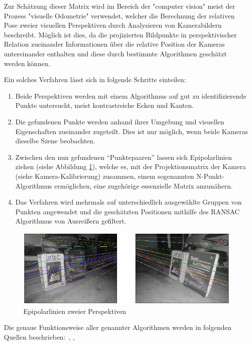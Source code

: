 \documentclass[12pt, ngerman]{article}
\begin{document}
Zur Schätzung dieser Matrix wird im Bereich der "computer vision" meist der Prozess "visuelle Odometrie" verwendet, welcher die Berechnung der relativen Pose zweier visuellen Perspektiven durch Analysieren von Kamerabildern beschreibt. Möglich ist dies, da die projizierten Bildpunkte in perspektivischer Relation zueinander Informationen über die relative Position der Kameras untereinander enthalten und diese durch bestimmte Algorithmen geschätzt werden können.

Ein solches Verfahren lässt sich in folgende Schritte einteilen:

\begin{enumerate}
  \item Beide Perspektiven werden mit einem Algorithmus auf gut zu identifizierende Punkte untersucht, meist kontrastreiche Ecken und Kanten.
  \item Die gefundenen Punkte werden anhand ihrer Umgebung und visuellen Eigenschaften zueinander zugeteilt. Dies ist nur möglich, wenn beide Kameras dieselbe Szene beobachten.
  \item Zwischen den nun gefundenen ``Punktepaaren'' lassen sich
  Epipolarlinien \cite{wiki_epipolar} ziehen (siehe Abbildung \ref{Abb: epipolar}), welche es, mit der Projektionsmatrix der Kamera (siehe
  Kamera-Kalibrierung) zusammen, einem sogenannten N-Punkt-Algorithmus
  ermöglichen, eine zugehörige essenzielle Matrix anzunähern.
  \item Das Verfahren wird mehrmals auf unterschiedlich ausgewählte Gruppen
  von Punkten angewendet und die geschätzten Positionen mithilfe des RANSAC
  Algorithmus von Ausreißern gefiltert.
\end{enumerate}

\begin{figure}[hbtp!]
    \includegraphics[width=\textwidth]{epipolar_2.png}
    \caption{Epipolarlinien zweier Perspektiven}
    \label{Abb: epipolar}
\end{figure}

Die genaue Funktionsweise aller genannter Algorithmen werden in folgenden Quellen beschrieben: \cite{stereo_geometry}, \cite{visual_odometry}, \cite{jsan}
\end{document}
